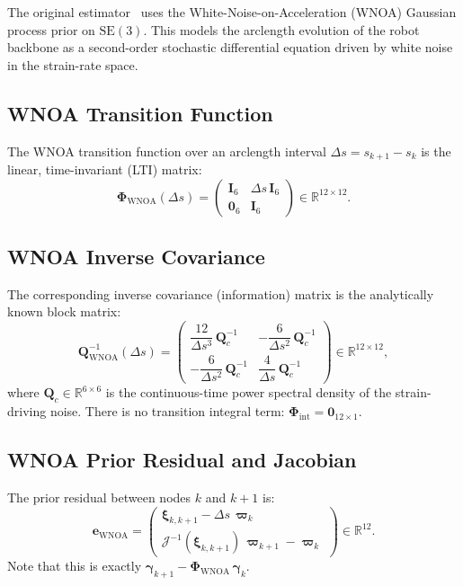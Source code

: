 \documentclass[11pt,a4paper]{article}
\newcommand{\SE}{\mathrm{SE}(3)}
\newcommand{\Jac}{\mathcal{J}}
\newcommand{\R}{\mathbb{R}}
\newcommand{\inv}{^{-1}}
\newcommand{\bxi}{\bm{\xi}}
\newcommand{\bvarpi}{\bm{\varpi}}
\newcommand{\bgamma}{\bm{\gamma}}
\newcommand{\bPhi}{\bm{\Phi}}
\newcommand{\be}{\mathbf{e}}
\newcommand{\bQ}{\mathbf{Q}}
\newcommand{\bI}{\mathbf{I}}
\newcommand{\bzero}{\mathbf{0}}
\begin{document}
The original estimator~\cite{lilge2022multi} uses the White-Noise-on-Acceleration (WNOA) Gaussian process prior on $\SE$.
This models the arclength evolution of the robot backbone as a second-order stochastic differential equation driven by white noise in the strain-rate space.

\subsection{WNOA Transition Function}
\label{sec:wnoa-phi}
The WNOA transition function over an arclength interval $\Delta s = s_{k+1} - s_k$ is the linear, time-invariant (LTI) matrix:
\begin{equation}
    \bPhi_{\mathrm{WNOA}}(\Delta s) = \begin{pmatrix} \bI_6 & \Delta s\,\bI_6 \\ \bzero_6 & \bI_6 \end{pmatrix} \in \R^{12 \times 12}.
    \label{eq:phi-wnoa}
\end{equation}

\subsection{WNOA Inverse Covariance}
\label{sec:wnoa-qinv}
The corresponding inverse covariance (information) matrix is the analytically known block matrix:
\begin{equation}
    \bQ_{\mathrm{WNOA}}\inv(\Delta s) = \begin{pmatrix}
        \dfrac{12}{\Delta s^3}\,\bQ_c\inv & -\dfrac{6}{\Delta s^2}\,\bQ_c\inv \\[8pt]
        -\dfrac{6}{\Delta s^2}\,\bQ_c\inv & \dfrac{4}{\Delta s}\,\bQ_c\inv
    \end{pmatrix} \in \R^{12 \times 12},
    \label{eq:qinv-wnoa}
\end{equation}
where $\bQ_c \in \R^{6 \times 6}$ is the continuous-time power spectral density of the strain-driving noise.
There is no transition integral term: $\bPhi_{\mathrm{int}} = \bzero_{12 \times 1}$.

\subsection{WNOA Prior Residual and Jacobian}
\label{sec:wnoa-prior}
The prior residual between nodes $k$ and $k{+}1$ is:
\begin{equation}
    \be_{\mathrm{WNOA}} = \begin{pmatrix} \bxi_{k,k+1} - \Delta s\,\bvarpi_k \\ \Jac\inv(\bxi_{k,k+1})\,\bvarpi_{k+1} - \bvarpi_k \end{pmatrix} \in \R^{12}.
    \label{eq:e-wnoa}
\end{equation}
Note that this is exactly $\bgamma_{k+1} - \bPhi_{\mathrm{WNOA}}\,\bgamma_k$.
\end{document}
